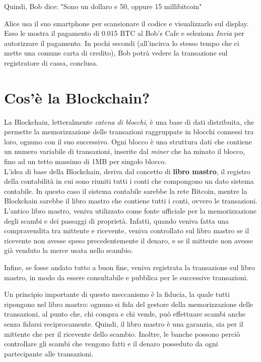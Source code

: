 Quindi, Bob dice: "Sono un dollaro e 50, oppure 15 millibitcoin"

Alice usa il suo smartphone per scansionare il codice e visualizzarlo sul display. Esso le mostra il pagamento di 0.015 BTC al Bob's Cafe e seleziona \textit{Invia} per autorizzare il pagamento. In pochi secondi (all'incirca lo stesso tempo che ci mette una comune carta di credito), Bob potrà vedere la transazione sul registratore di cassa, conclusa.\cite{antonopoulos2014mastering}

\section{Cos'è la Blockchain?}
La Blockchain, letteralmente \textit{catena di blocchi}, è una base di dati distribuita, che permette la memorizzazione delle transazioni raggruppate in blocchi connessi tra loro, ognuno con il suo successivo. Ogni blocco è una struttura dati che contiene un numero variabile di transazioni, inserite dal \textit{miner} che ha minato il blocco, fino ad un tetto massimo di 1MB per singolo blocco.\\

L'idea di base della Blockchain, deriva dal concetto di \textbf{libro mastro}, il registro della contabilità in cui sono riuniti tutti i conti che compongono un dato sistema contabile. In questo caso il sistema contabile sarebbe la rete Bitcoin, mentre la Blockchain sarebbe il libro mastro che contiene tutti i conti, ovvero le transazioni. \\

L'antico libro mastro, veniva utilizzato come fonte ufficiale per la memorizzazione degli scambi e dei passaggi di proprietà. Infatti, quando veniva fatta una compravendita tra mittente e ricevente, veniva controllato sul libro mastro se il ricevente non avesse speso precedentemente il denaro, e se il mittente non avesse già venduto la merce usata nello scambio.

Infine, se fosse andato tutto a buon fine, veniva registrata la transazione sul libro mastro, in modo da essere consultabile e pubblica per le successive transazioni.

Un principio importante di questo meccanismo è la fiducia, la quale tutti ripongono nel libro mastro: ognuno si fida del gestore della memorizzazione delle transazioni, al punto che, chi compra e chi vende, può effettuare scambi anche senza fidarsi reciprocamente. Quindi, il libro mastro è una garanzia, sia per il mittente che per il ricevente dello scambio. Inoltre, le banche possono perciò controllare gli scambi che vengono fatti e il denaro posseduto da ogni partecipante alle transazioni.

